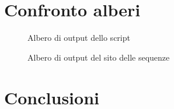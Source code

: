 \documentclass[11pt,italian]{article}
\begin{document}
\section{Confronto alberi}
\begin{figure}[H]
  \caption{Albero di output dello script}
  \label{fig:jalview-end}
\end{figure}
\begin{figure}[H]
  \caption{Albero di output del sito delle sequenze}
  \label{fig:jalview-end}
\end{figure}

\newpage
\section{Conclusioni}
\end{document}
